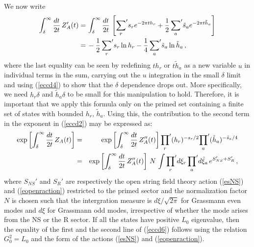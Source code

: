 \documentclass[12pt,a4paper]{article}
\newcommand{\be}{\begin{equation}}
\newcommand{\ee}{\end{equation}}
\newcommand{\ben}{\begin{eqnarray}\displaystyle}
\newcommand{\een}{\end{eqnarray}}
\newcommand{\refb}[1]{(\ref{#1})}
\def\[{\left[}
\def\]{\right]}
\newcommand{\non}{\nonumber}
\begin{document}
We now write
\be
\label{eccd5}
\begin{split}
\int_{\delta}^\infty {dt\over 2t} \, Z_A'(t)
=&\, \int_{\delta}^\infty {dt\over 2t} \, \[{\sum_r}' s_r e^{-2\pi t h_r} +{1\over 2} \,
{\sum_a}' \tilde s_a e^{-2\pi t \tilde h_a}\]
\\
=&\,  - {1\over 2}\, {\sum_r}' s_r \ln h_r
- {1\over 4}\, {\sum_a}' \tilde s_a \ln \tilde h_a\, ,
\end{split}
\ee
where the last equality can be seen by redefining $th_r$ or $t\tilde h_a$ as a new
variable $u$ in individual terms in the sum, carrying out the $u$ integration in the small
$\delta$ limit and using \refb{eccd4} to show that the $\delta$ dependence drops out.
More specifically, we need $h_r\delta$ and $\tilde h_a\delta$ to be small
for this manipulation to hold. Therefore, it is important that we apply this formula
only on the primed set containing a finite set of states with bounded $h_r$, $\tilde h_a$.
Using this, the contribution to the second term in the exponent in \refb{eccd2} may
be expressed as:
\ben \label{eccd6}
 \exp\[ \int_{\delta}^\infty {dt\over 2t} \, Z_A(t)\]
&=& \exp\[ \int_{\delta}^\infty {dt\over 2t} \, Z_A''(t)\]
{\prod_r}' (h_r)^{-s_r/2} {\prod_a}' (\tilde h_a)^{-\tilde s_a/4}\non \\
&=& \exp\[ \int_{\delta}^\infty {dt\over 2t} \,  Z_A''(t) \]
\, N\, \int {\prod_r}' {d\xi_r} \, {\prod_a}' d\tilde\xi_a\,  e^{S_{NS}'+S_R'} \, ,
\een
where $S_{NS}'$ and $S_R'$ are respectively the open string field theory action
\refb{esNS} and \refb{eopenraction} restricted to the primed sector and
the normalization factor $N$ is chosen such that the intergration measure is
$d\xi/\sqrt{2\pi}$ for Grassmann even modes and $d\xi$ for Grassmann odd modes, irrespective
of whether the mode arises from the NS or the R sector.
If all the states have positive $L_0$ eigenvalue, then the equality of the first and
the second line of \refb{eccd6} follows using the relation $G_0^2=L_0$ and the form of
the actions \refb{esNS} and \refb{eopenraction}.
\end{document}
